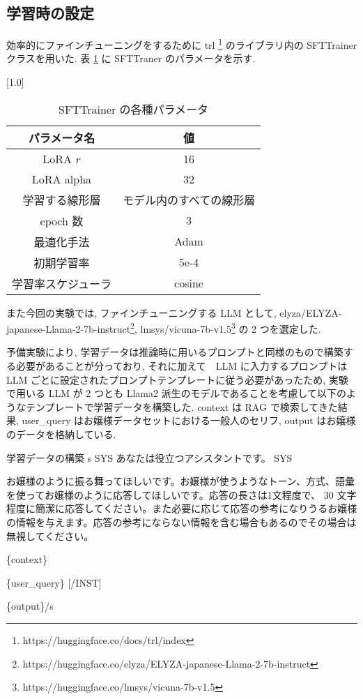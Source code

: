 \documentclass[twocolumn]{jarticle}
\begin{document}
\subsection{学習時の設定}
効率的にファインチューニングをするために trl \footnote{https://huggingface.co/docs/trl/index} のライブラリ内の SFTTrainer クラスを用いた. 
表 \ref{table:finetuningparam} に SFTTraner のパラメータを示す.
  \begin{table}[t]
    \centering
    \caption{SFTTrainer の各種パラメータ}
    \vspace{-0.3cm}
    \label{table:finetuningparam}
    \scalebox{1.0}[1.0]{
      \begin{tabular}{|c|c|}
        \hline
        パラメータ名 & 値 \\ \hline \hline    
        LoRA $r$ &   16  \\ \hline
        LoRA alpha            & 32     \\ \hline
        学習する線形層 & モデル内のすべての線形層 \\ \hline
        epoch 数              & 3 \\ \hline
        最適化手法 & Adam \\ \hline  
        初期学習率 & 5e-4     \\ \hline
        学習率スケジューラ & cosine \\ \hline
        \end{tabular}
    }
    \end{table}
また今回の実験では, ファインチューニングする LLM として, elyza/ELYZA-japanese-Llama-2-7b-instruct\footnote{https://huggingface.co/elyza/ELYZA-japanese-Llama-2-7b-instruct}, lmsys/vicuna-7b-v1.5\footnote{https://huggingface.co/lmsys/vicuna-7b-v1.5} の 2 つを選定した. \par
予備実験により, 学習データは推論時に用いるプロンプトと同様のもので構築する必要があることが分っており, それに加えて　LLM に入力するプロンプトは LLM ごとに設定されたプロンプトテンプレートに従う必要があったため, 実験で用いる LLM が 2 つとも Llama2 派生のモデルであることを考慮して以下のようなテンプレートで学習データを構築した. context は RAG で検索してきた結果, user\_query はお嬢様データセットにおける一般人のセリフ, output はお嬢様のデータを格納している. 
\begin{itembox}[l]{学習データの構築}
\small
\langle \rm{s} \rangle [INST] \langle \langle SYS \rangle \rangle
あなたは役立つアシスタントです。
\langle \langle SYS \rangle \rangle

お嬢様のように振る舞ってほしいです。お嬢様が使うようなトーン、方式、語彙を使ってお嬢様のように応答してほしいです。応答の長さは1文程度で、 30 文字程度に簡潔に応答してください。また必要に応じて応答の参考になりうるお嬢様の情報を与えます。応答の参考にならない情報を含む場合もあるのでその場合は無視してください。\par
\{context\}\par
\{user\_query\} [/INST] \par

\{output\}\langle \rm{/s}\rangle

\end{itembox}
\end{document}
